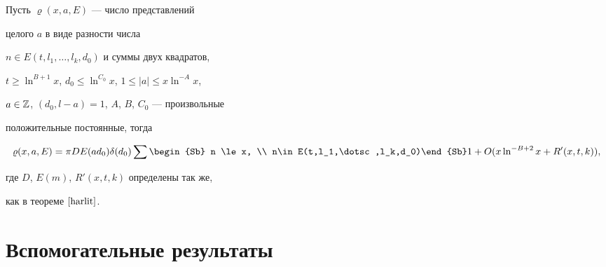\begin{thm}


\label{harlit2}


Пусть $\varrho(x, a, E)$ --- число представлений


целого $a$ в виде разности числа


$n\in E(t,l_1,\dotsc,l_k,d_0)$ и суммы двух квадратов,


$t\ge \ln^{B+1} x$, $d_0 \le \ln^{C_0} x$, $1 \le |a| \le x \ln^{-A}x$,


$a \in \Bbb Z$, $(d_0, l-a)=1$, $A$, $B$, $C_0$ --- произвольные


положительные постоянные, тогда


$$


\varrho(x, a, E)


= \pi D E(a d_0) \delta(d_0)


\sum \begin{Sb} n \le x, \\ n\in E(t,l_1,\dotsc,l_k,d_0)\end{Sb}


1+ O ( x \ln^{- B + 2} x + R'(x, t, k) ),


$$


где $D$, $E(m)$, $R'(x, t, k)$ определены так же,


как в теореме $\ref{harlit}$.


\end{thm}





\section*{Вспомогательные результаты}





